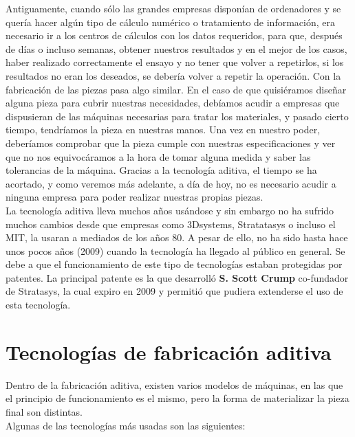 Antiguamente, cuando sólo las grandes empresas disponían de ordenadores y se quería hacer algún tipo de cálculo numérico o tratamiento de información, era necesario ir a los centros de cálculos con los datos requeridos, para que, después de días o incluso semanas, obtener nuestros resultados y en el mejor de los casos, haber realizado correctamente el ensayo y no tener que volver a repetirlos, si los resultados no eran los deseados, se debería volver a repetir la operación. Con la fabricación de las piezas pasa algo similar. En el caso de que quisiéramos diseñar alguna pieza para cubrir nuestras necesidades, debíamos acudir a empresas que dispusieran de las máquinas necesarias para tratar los materiales, y pasado cierto tiempo, tendríamos la pieza en nuestras manos. Una vez en nuestro poder, deberíamos comprobar que la pieza cumple con nuestras especificaciones y ver que no nos equivocáramos a la hora de tomar alguna medida y saber las tolerancias de la máquina. Gracias a la tecnología aditiva, el tiempo se ha acortado, y como veremos más adelante, a día de hoy, no es necesario acudir a ninguna empresa para poder realizar nuestras propias piezas.\\

La tecnología aditiva lleva muchos años usándose y sin embargo no ha sufrido muchos cambios desde que empresas como 3Dsystems, Stratatasys o incluso el MIT, la usaran a mediados de los años 80. A pesar de ello, no ha sido hasta hace unos pocos años (2009) cuando la tecnología ha llegado al público en general. Se debe a que el funcionamiento de este tipo de tecnologías estaban protegidas por patentes. La principal patente \cite{crump1992apparatus} es la que desarrolló \textbf{S. Scott Crump} co-fundador de Stratasys, la cual expiro en 2009 y permitió que pudiera extenderse el uso de esta tecnología.\\

\section{Tecnologías de fabricación aditiva}

Dentro de la fabricación aditiva, existen varios modelos de máquinas, en las que el principio de funcionamiento es el mismo, pero la forma de materializar la pieza final son distintas.\\

Algunas de las tecnologías más usadas son las siguientes:

